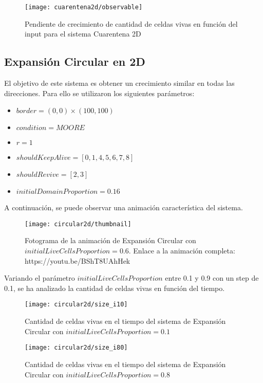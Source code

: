 \begin{figure}[H]
    \centering
    \texttt{[image: cuarentena2d/observable]}
    \caption{Pendiente de crecimiento de cantidad de celdas vivas en función del input para el sistema Cuarentena 2D}
    \label{fig:cuarentena2d_observable}
\end{figure}


\subsection{Expansión Circular en 2D}\label{subsec:expansion-circular-2D}

El objetivo de este sistema es obtener un crecimiento similar en todas las direcciones. Para ello se utilizaron los siguientes parámetros:

\begin{itemize}
    \item $border = (0, 0) \times (100, 100)$
    \item $condition = MOORE$
    \item $r = 1$
    \item $shouldKeepAlive = [0, 1, 4, 5, 6, 7, 8]$
    \item $shouldRevive = [2, 3]$
    \item $initialDomainProportion = 0.16$
\end{itemize}

A continuación, se puede observar una animación característica del sistema.

\begin{figure}[H]
    \centering
    \texttt{[image: circular2d/thumbnail]}
    \caption{Fotograma de la animación de Expansión Circular con $initialLiveCellsProportion = 0.6$. Enlace a la animación completa: https://youtu.be/BShT8UAhHek}
    \label{fig:thumbnailcircular2d_i60}
\end{figure}

Variando el parámetro $initialLiveCellsProportion$ entre 0.1 y 0.9 con un step de 0.1, se ha analizado la cantidad de celdas vivas en función
del tiempo.

\begin{figure}[H]
    \centering
    \texttt{[image: circular2d/size\_i10]}
    \caption{Cantidad de celdas vivas en el tiempo del sistema de Expansión Circular con $initialLiveCellsProportion = 0.1$}
    \label{fig:circular2d_i10}
\end{figure}
\begin{figure}[H]
    \centering
    \texttt{[image: circular2d/size\_i80]}
    \caption{Cantidad de celdas vivas en el tiempo del sistema de Expansión Circular con $initialLiveCellsProportion = 0.8$}
    \label{fig:circular2d_i80}
\end{figure}


